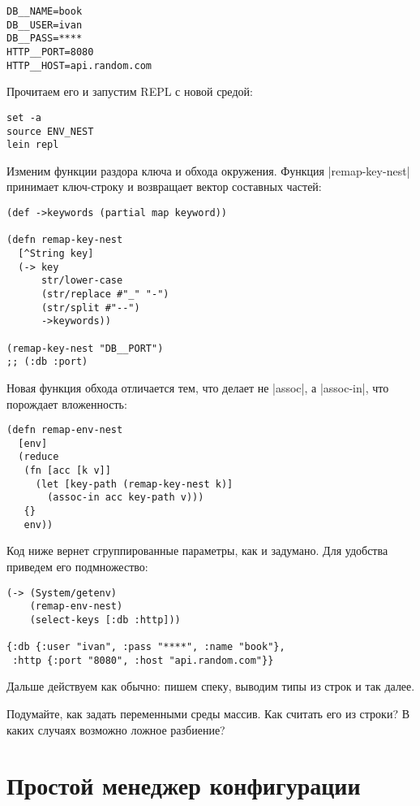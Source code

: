 \begin{verbatim}
DB__NAME=book
DB__USER=ivan
DB__PASS=****
HTTP__PORT=8080
HTTP__HOST=api.random.com
\end{verbatim}

\noindent
Прочитаем его и запустим REPL с новой средой:

\begin{verbatim}
set -a
source ENV_NEST
lein repl
\end{verbatim}

Изменим функции раздора ключа и обхода окружения. Функция
\spverb|remap-key-nest| принимает ключ-строку и возвращает вектор составных
частей:

\begin{verbatim}
(def ->keywords (partial map keyword))

(defn remap-key-nest
  [^String key]
  (-> key
      str/lower-case
      (str/replace #"_" "-")
      (str/split #"--")
      ->keywords))

(remap-key-nest "DB__PORT")
;; (:db :port)
\end{verbatim}

Новая функция обхода отличается тем, что делает не \spverb|assoc|, а
\spverb|assoc-in|, что порождает вложенность:

\begin{verbatim}
(defn remap-env-nest
  [env]
  (reduce
   (fn [acc [k v]]
     (let [key-path (remap-key-nest k)]
       (assoc-in acc key-path v)))
   {}
   env))
\end{verbatim}

Код ниже вернет сгруппированные параметры, как и задумано. Для удобства приведем
его подмножество:

\begin{verbatim}
(-> (System/getenv)
    (remap-env-nest)
    (select-keys [:db :http]))

{:db {:user "ivan", :pass "****", :name "book"},
 :http {:port "8080", :host "api.random.com"}}
\end{verbatim}

\noindent
Дальше действуем как обычно: пишем спеку, выводим типы из строк и так далее.

Подумайте, как задать переменными среды массив. Как считать его из строки? В
каких случаях возможно ложное разбиение?


\section{Простой менеджер конфигурации}

